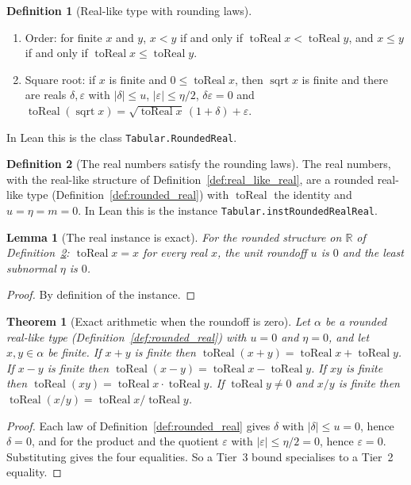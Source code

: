 \documentclass[11pt,a4paper]{article}
\theoremstyle{definition}
\newtheorem{definition}{Definition}
\theoremstyle{plain}
\newtheorem{lemma}{Lemma}
\newtheorem{theorem}{Theorem}
\theoremstyle{remark}
\newcommand{\R}{\mathbb{R}}
\newcommand{\code}[1]{\texttt{#1}}
\begin{document}
\begin{definition}[Real-like type with rounding laws]
\begin{enumerate}
$|\delta| \le u$ and $\operatorname{toReal}(n) = n (1 + \delta)$; if $n\,u \le 1$, the cast of
$n$ is finite and $\operatorname{toReal}(n) = n$.
\item Order: for finite $x$ and $y$, $x < y$ if and only if
$\operatorname{toReal} x < \operatorname{toReal} y$, and $x \le y$ if and only if
$\operatorname{toReal} x \le \operatorname{toReal} y$.
\item Square root: if $x$ is finite and $0 \le \operatorname{toReal} x$, then
$\operatorname{sqrt} x$ is finite and there are reals $\delta, \varepsilon$ with
$|\delta| \le u$, $|\varepsilon| \le \eta/2$, $\delta\varepsilon = 0$ and
$\operatorname{toReal}(\operatorname{sqrt} x) = \sqrt{\operatorname{toReal} x}\,(1 + \delta) + \varepsilon$.
\end{enumerate}
In Lean this is the class \code{Tabular.RoundedReal}.
\end{definition}

\begin{definition}[The real numbers satisfy the rounding laws]\label{def:rounded_real_real}
The real numbers, with the real-like structure of Definition~\ref{def:real_like_real}, are a
rounded real-like type (Definition~\ref{def:rounded_real}) with
$\operatorname{toReal}$ the identity and $u = \eta = m = 0$. In Lean this is the instance
\code{Tabular.instRoundedRealReal}.
\end{definition}

\begin{lemma}[The real instance is exact]\label{lem:rounded_real_exact}
For the rounded structure on $\R$ of Definition~\ref{def:rounded_real_real}:
$\operatorname{toReal} x = x$ for every real $x$, the unit roundoff $u$ is $0$ and the least
subnormal $\eta$ is $0$.
\end{lemma}
\begin{proof}
By definition of the instance.
\end{proof}

\begin{theorem}[Exact arithmetic when the roundoff is zero]\label{thm:exact_of_u_zero}
Let $\alpha$ be a rounded real-like type (Definition~\ref{def:rounded_real}) with $u = 0$ and
$\eta = 0$, and let $x, y \in \alpha$ be finite. If $x + y$ is finite then
$\operatorname{toReal}(x + y) = \operatorname{toReal} x + \operatorname{toReal} y$. If $x - y$
is finite then
$\operatorname{toReal}(x - y) = \operatorname{toReal} x - \operatorname{toReal} y$. If $x y$ is
finite then
$\operatorname{toReal}(x y) = \operatorname{toReal} x \cdot \operatorname{toReal} y$. If
$\operatorname{toReal} y \ne 0$ and $x / y$ is finite then
$\operatorname{toReal}(x / y) = \operatorname{toReal} x / \operatorname{toReal} y$.
\end{theorem}
\begin{proof}
Each law of Definition~\ref{def:rounded_real} gives $\delta$ with $|\delta| \le u = 0$, hence
$\delta = 0$, and for the product and the quotient $\varepsilon$ with
$|\varepsilon| \le \eta/2 = 0$, hence $\varepsilon = 0$. Substituting gives the four
equalities. So a Tier~3 bound specialises to a Tier~2 equality.
\end{proof}
\end{document}
